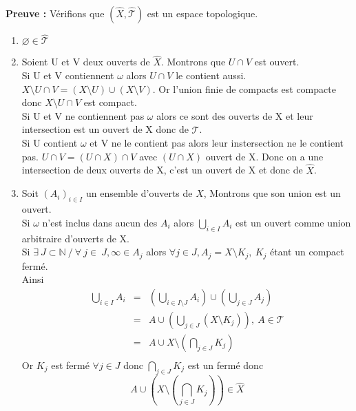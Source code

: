 \documentclass{report}
\theoremstyle{plain}
\newcommand\T{\mathcal{T}}
\begin{document}
		\textbf{Preuve :} Vérifions que $(\hat{X}, \hat{\T})$ est un espace topologique.
		    \begin{enumerate}
	        	\item $\varnothing \in \hat{\T}$
	        	\item Soient U et V deux ouverts de $\hat{X}$. Montrons que $U \cap V$ est ouvert. \\
        		Si U et V contiennent $\omega$ alors $U \cap V$ le contient aussi. $X\setminus U \cap V = (X\setminus U) \cup (X\setminus V) $. Or l'union finie de compacts est compacte donc $X\setminus U \cap V$ est compact.\\
        		Si U et V ne contiennent pas $\omega$ alors ce sont des ouverts de X et leur intersection est un ouvert de X donc de $\hat{\T}$.\\
        		Si U contient $\omega$ et V ne le contient pas alors leur instersection ne le contient pas. $U \cap V = (U \cap X)\cap V$ avec $(U \cap X)$ ouvert de X. Donc on a une intersection de deux ouverts de X, c'est un ouvert de X et donc de $\hat{X}$.
	        	\item Soit $(A_i)_{i\in I}$ un ensemble d'ouverts de $\hat{X}$, Montrons que son union est un ouvert.\\
	        	Si $\omega$ n'est inclus dans aucun des $A_i$ alors $\bigcup\limits_{i\in I} A_i$ est un ouvert comme union arbitraire d'ouverts de X.\\
	        	Si $\exists\ J\subset\mathbb{N}\ /\ \forall\ j\in\ J, \infty\in A_{j}$ alors $\forall j \in J, A_j=X\setminus K_j,\ K_j$ étant un compact fermé.\\
	        	Ainsi$$
	        	\left.
		        	\begin{array}{lll}
		        		\bigcup\limits_{i\in I}A_i & = & (\bigcup\limits_{i\in I\setminus J}A_i) \cup (\bigcup\limits_{j\in J}A_j)\\
		        		& = & A\cup(\bigcup\limits_{j\in J}(X\setminus K_j)),\: A\in\T\\
		        		& = & A\cup X\setminus(\bigcap\limits_{j\in J}K_j)\\
		        	\end{array}
	        	\right.$$
	        	Or $K_j$ est fermé $\forall j\in J$ donc $\bigcap\limits_{j\in J}K_j$ est un fermé donc $$A\cup (X\setminus(\bigcap\limits_{j\in J}K_j))\in \hat{X}$$
	        \end{enumerate}
\end{document}
